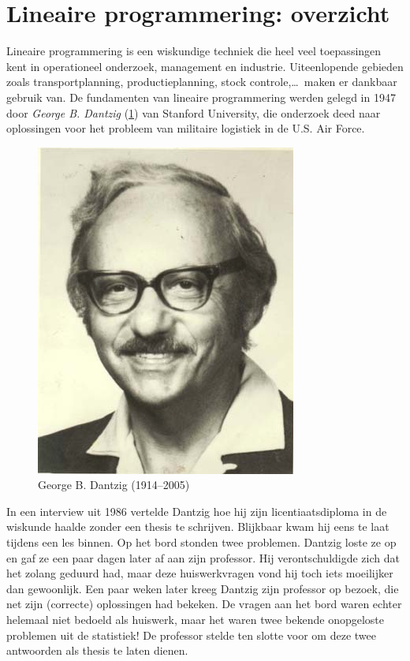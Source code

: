 \section{Lineaire programmering: overzicht}
Lineaire programmering is een wiskundige techniek die heel veel
toepassingen kent in operationeel onderzoek, management en industrie.
Uiteenlopende gebieden zoals transportplanning, productieplanning,
stock controle,\ldots \ maken er dankbaar gebruik van. De fundamenten
van lineaire programmering werden gelegd in 1947 door \emph{George
B. Dantzig} (\cref{fig:dantzig}) van Stanford University, die onderzoek deed naar oplossingen
voor het probleem van militaire logistiek in de U.S. Air Force.
\begin{figure}[htbp]
    \centering
\includegraphics[scale=0.5]{figuren/lp/dantzig.jpg} 
     \caption{George B. Dantzig (1914--2005)}
    \label{fig:dantzig}
\end{figure}
In een interview uit 1986 vertelde Dantzig hoe hij zijn licentiaatsdiploma
in de wiskunde haalde zonder een thesis te schrijven. Blijkbaar
kwam hij eens te laat tijdens een les binnen. Op het bord stonden
twee problemen. Dantzig loste ze op en gaf ze een paar dagen later
af aan zijn professor. Hij verontschuldigde zich dat het zolang
geduurd had, maar deze huiswerkvragen vond hij toch iets moeilijker
dan gewoonlijk. Een paar weken later kreeg Dantzig zijn professor
op bezoek, die net zijn (correcte) oplossingen had bekeken. De
vragen aan het bord waren echter helemaal niet bedoeld als huiswerk,
maar het waren twee bekende onopgeloste problemen uit de statistiek!
De professor stelde ten slotte voor om deze twee antwoorden als
thesis te laten dienen.

